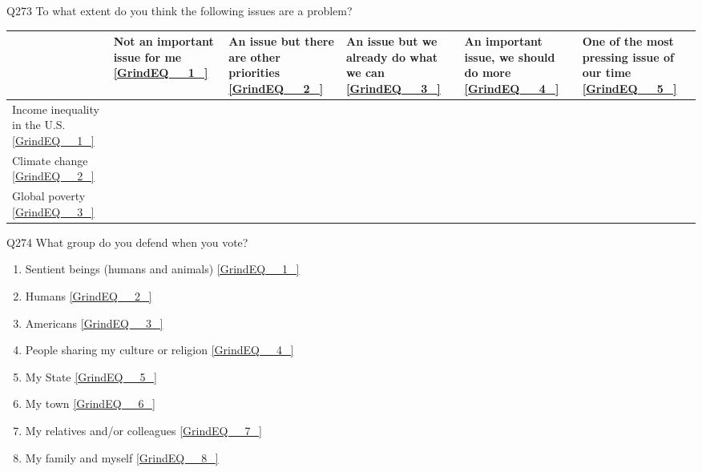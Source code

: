\documentclass{article} %
\begin{document}
\noindent 

\noindent 

\noindent 

\noindent Q273 To what extent do you think the following issues are a problem? ~

\begin{tabular}{|p{0.7in}|p{0.7in}|p{0.7in}|p{0.7in}|p{0.7in}|p{0.7in}|} \hline 
 & Not an important issue for me \eqref{GrindEQ__1_} & An issue but there are other priorities \eqref{GrindEQ__2_} & An issue but we already do what we can \eqref{GrindEQ__3_} & An important issue, we should do more \eqref{GrindEQ__4_} & One of the most pressing issue of our time \eqref{GrindEQ__5_} \\ \hline 
Income inequality in the U.S. \eqref{GrindEQ__1_}  &   &   &   &   &   \\ \hline 
Climate change \eqref{GrindEQ__2_}  &   &   &   &   &   \\ \hline 
Global poverty \eqref{GrindEQ__3_}  &   &   &   &   &   \\ \hline 
\end{tabular}



\noindent 

\noindent 

\noindent 

\noindent Q274 What group do you defend when you vote?

\begin{enumerate}
\item  Sentient beings (humans and animals)  \eqref{GrindEQ__1_} 

\item  Humans  \eqref{GrindEQ__2_} 

\item  Americans  \eqref{GrindEQ__3_} 

\item  People sharing my culture or religion  \eqref{GrindEQ__4_} 

\item  My State  \eqref{GrindEQ__5_} 

\item  My town  \eqref{GrindEQ__6_} 

\item  My relatives and/or colleagues  \eqref{GrindEQ__7_} 

\item  My family and myself  \eqref{GrindEQ__8_} 
\end{enumerate}
\end{document}
